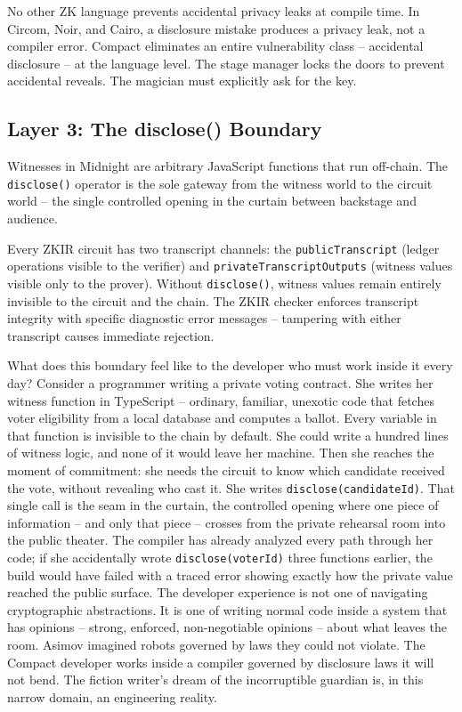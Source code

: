 \documentclass[
  11pt,
  openany]{report}
\begin{document}
No other ZK language prevents accidental privacy leaks at compile time. In
Circom, Noir, and Cairo, a disclosure mistake produces a privacy leak, not a
compiler error. Compact eliminates an entire vulnerability class -- accidental
disclosure -- at the language level. The stage manager locks the doors to
prevent accidental reveals. The magician must explicitly ask for the key.

\subsection{Layer 3: The disclose()
Boundary}\label{layer-3-the-disclose-boundary}

Witnesses in Midnight are arbitrary JavaScript functions that run off-chain. The
\texttt{disclose()} operator is the sole gateway from the witness world to the
circuit world -- the single controlled opening in the curtain between backstage
and audience.

Every ZKIR circuit has two transcript channels: the \texttt{publicTranscript}
(ledger operations visible to the verifier) and
\texttt{privateTranscriptOutputs} (witness values visible only to the prover).
Without \texttt{disclose()}, witness values remain entirely invisible to the
circuit and the chain. The ZKIR checker enforces transcript integrity with
specific diagnostic error messages -- tampering with either transcript causes
immediate rejection.

What does this boundary feel like to the developer who must work inside it every
day? Consider a programmer writing a private voting contract. She writes her
witness function in TypeScript -- ordinary, familiar, unexotic code that fetches
voter eligibility from a local database and computes a ballot. Every variable in
that function is invisible to the chain by default. She could write a hundred
lines of witness logic, and none of it would leave her machine. Then she reaches
the moment of commitment: she needs the circuit to know which candidate received
the vote, without revealing who cast it. She writes
\texttt{disclose(candidateId)}. That single call is the seam in the curtain, the
controlled opening where one piece of information -- and only that piece --
crosses from the private rehearsal room into the public theater. The compiler
has already analyzed every path through her code; if she accidentally wrote
\texttt{disclose(voterId)} three functions earlier, the build would have failed
with a traced error showing exactly how the private value reached the public
surface. The developer experience is not one of navigating cryptographic
abstractions. It is one of writing normal code inside a system that has opinions
-- strong, enforced, non-negotiable opinions -- about what leaves the room.
Asimov imagined robots governed by laws they could not violate. The Compact
developer works inside a compiler governed by disclosure laws it will not bend.
The fiction writer's dream of the incorruptible guardian is, in this narrow
domain, an engineering reality.
\end{document}
